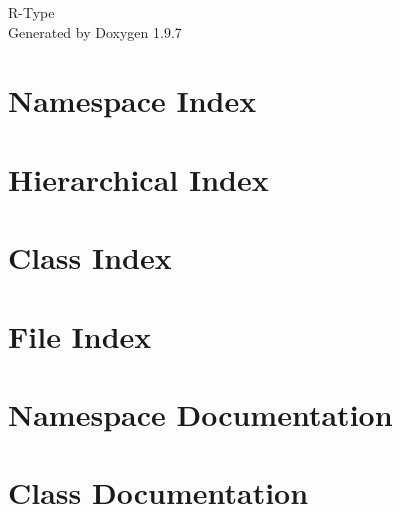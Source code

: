 \documentclass[twoside]{book}
\newcommand{\+}{\discretionary{\mbox{\scriptsize$\hookleftarrow$}}{}{}}
\newcommand{\clearemptydoublepage}{%
    \newpage{\pagestyle{empty}\cleardoublepage}%
  }
\begin{document}
  \raggedbottom
    \hypersetup{pageanchor=false,
                bookmarksnumbered=true,
                pdfencoding=unicode
               }
  \begin{titlepage}
  \vspace*{7cm}
  \begin{center}%
  {\Large R-\/\+Type}\\
  \vspace*{1cm}
  {\large Generated by Doxygen 1.9.7}\\
  \end{center}
  \end{titlepage}
  \clearemptydoublepage
  \tableofcontents
  \clearemptydoublepage
  \hypersetup{pageanchor=true}
\chapter{Namespace Index}

\chapter{Hierarchical Index}

\chapter{Class Index}

\chapter{File Index}

\chapter{Namespace Documentation}




\chapter{Class Documentation}



























\end{document}
